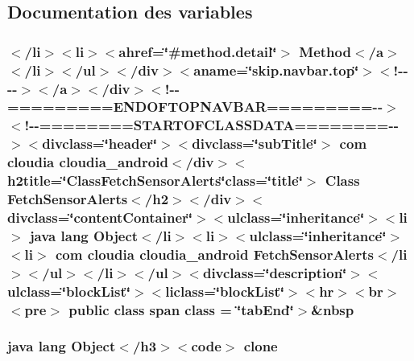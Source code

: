 \subsection{Documentation des variables}
\hypertarget{cloudia__android_2_fetch_sensor_alerts_8html_a3b6042dd1b7868610d47d4099aef7a9f}{
\subsubsection[{class}]{\setlength{\rightskip}{0pt plus 5cm}$<$/li$>$$<$li$>$$<$ahref=\char`\"{}\#method.\-detail\char`\"{}$>$ Method$<$/{\bf a}$>$$<$/li$>$$<$/ul$>$$<$/div$>$$<$aname=\char`\"{}skip.\-navbar.\-top\char`\"{}$>$$<$!-\/-\/-\/-\/$>$$<$/a$>$$<$/div$>$$<$!-\/-\/=========E\-N\-D\-O\-F\-T\-O\-P\-N\-A\-V\-B\-A\-R=========-\/-\/$>$$<$!-\/-\/========S\-T\-A\-R\-T\-O\-F\-C\-L\-A\-S\-S\-D\-A\-T\-A========-\/-\/$>$$<$divclass=\char`\"{}header\char`\"{}$>$$<$divclass=\char`\"{}sub\-Title\char`\"{}$>$ com cloudia cloudia\-\_\-android$<$/div$>$$<$h2title=\char`\"{}Class\-Fetch\-Sensor\-Alerts\char`\"{}class=\char`\"{}title\char`\"{}$>$ Class {\bf Fetch\-Sensor\-Alerts}$<$/h2$>$$<$/div$>$$<$divclass=\char`\"{}content\-Container\char`\"{}$>$$<$ulclass=\char`\"{}inheritance\char`\"{}$>$$<$li$>$ java lang Object$<$/li$>$$<$li$>$$<$ulclass=\char`\"{}inheritance\char`\"{}$>$$<$li$>$ com cloudia cloudia\-\_\-android {\bf Fetch\-Sensor\-Alerts}$<$/li$>$$<$/ul$>$$<$/li$>$$<$/ul$>$$<$divclass=\char`\"{}description\char`\"{}$>$$<$ulclass=\char`\"{}block\-List\char`\"{}$>$$<$liclass=\char`\"{}block\-List\char`\"{}$>$$<$hr$>$$<$br$>$$<$pre$>$ public class {\bf span} class = \char`\"{}tab\-End\char`\"{}$>$\&nbsp}}\label{cloudia__android_2_fetch_sensor_alerts_8html_a3b6042dd1b7868610d47d4099aef7a9f}
\hypertarget{cloudia__android_2_fetch_sensor_alerts_8html_adc9607fcabf6f2d7f401ad52015ef6e0}{
\subsubsection[{clone}]{\setlength{\rightskip}{0pt plus 5cm}java lang Object$<$/h3$>$$<$code$>$ clone}}\label{cloudia__android_2_fetch_sensor_alerts_8html_adc9607fcabf6f2d7f401ad52015ef6e0}
